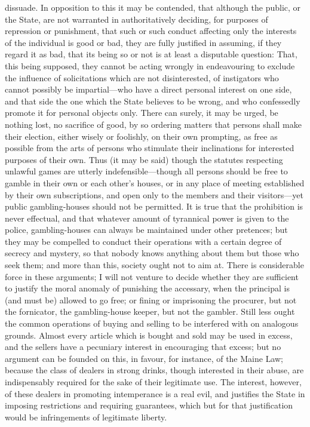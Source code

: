 \documentclass[12pt]{article}
\begin{document}
dissuade. In opposition to this it may be contended, that although the public, or the State, are not warranted in authoritatively deciding, for purposes of repression or punishment, that such or such conduct affecting only the interests of the individual is good or bad, they are fully justified in assuming, if they regard it as bad, that its being so or not is at least a disputable question: That, this being supposed, they cannot be acting wrongly in endeavouring to exclude the influence of solicitations which are not disinterested, of instigators who cannot possibly be impartial---who have a direct personal interest on one side, and that side the one which the State believes to be wrong, and who confessedly promote it for personal objects only. There can surely, it may be urged, be nothing lost, no sacrifice of good, by so ordering matters that persons shall make their election, either wisely or foolishly, on their own prompting, as free as possible from the arts of persons who stimulate their inclinations for interested purposes of their own. Thus (it may be said) though the statutes respecting unlawful games are utterly indefensible---though all persons should be free to gamble in their own or each other's houses, or in any place of meeting established by their own subscriptions, and open only to the members and their visitors---yet public gambling-houses should not be permitted. It is true that the prohibition is never effectual, and that whatever amount of tyrannical power is given to the police, gambling-houses can always be maintained under other pretences; but they may be compelled to conduct their operations with a certain degree of secrecy and mystery, so that nobody knows anything about them but those who seek them; and more than this, society ought not to aim at. There is considerable force in these arguments; I will not venture to decide whether they are sufficient to justify the moral anomaly of punishing the accessary, when the principal is (and must be) allowed to go free; or fining or imprisoning the procurer, but not the fornicator, the gambling-house keeper, but not the gambler. Still less ought the common operations of buying and selling to be interfered with on analogous grounds. Almost every article which is bought and sold may be used in excess, and the sellers have a pecuniary interest in encouraging that excess; but no argument can be founded on this, in favour, for instance, of the Maine Law; because the class of dealers in strong drinks, though interested in their abuse, are indispensably required for the sake of their legitimate use. The interest, however, of these dealers in promoting intemperance is a real evil, and justifies the State in imposing restrictions and requiring guarantees, which but for that justification would be infringements of legitimate liberty.
\end{document}
